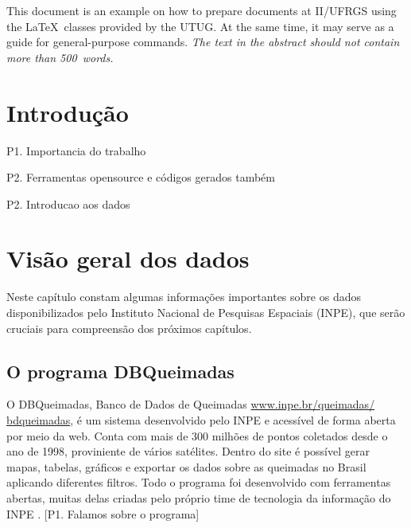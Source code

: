 \documentclass[cic,tc]{iiufrgs}
\begin{document}
\listoffigures

\listoftables

\begin{abstract}
Este documento é um exemplo de como formatar documentos para o
Instituto de Informática da UFRGS usando as classes \LaTeX\
disponibilizadas pelo UTUG\@. Ao mesmo tempo, pode servir de consulta
para comandos mais genéricos. \emph{O texto do resumo não deve
conter mais do que 500 palavras.}
\end{abstract}

\begin{translatedabstract}
This document is an example on how to prepare documents at II/UFRGS
using the \LaTeX\ classes provided by the UTUG\@. At the same time, it
may serve as a guide for general-purpose commands. \emph{The text in
the abstract should not contain more than 500~words.}
\end{translatedabstract}


\chapter{Introdução}
P1. Importancia do trabalho \par
P2. Ferramentas opensource e códigos gerados também \par
P2. Introducao aos dados \par


\chapter{Visão geral dos dados}

Neste capítulo constam algumas informações importantes sobre os 
dados disponibilizados pelo Instituto Nacional de Pesquisas Espaciais (INPE), 
que serão cruciais para compreensão dos próximos capítulos. 

\section{O programa DBQueimadas}

O DBQueimadas, Banco de Dados de Queimadas \url{www.inpe.br/queimadas/
bdqueimadas},
é um sistema desenvolvido pelo INPE e acessível de forma aberta por meio da web. 
Conta com mais de 300 milhões de pontos coletados desde o ano de 1998, 
proviniente de vários satélites. Dentro do site é possível gerar mapas,
tabelas, gráficos e exportar os dados sobre as queimadas no Brasil 
aplicando diferentes filtros. Todo o 
programa foi desenvolvido com ferramentas abertas, muitas delas 
criadas pelo próprio time de tecnologia da informação do INPE 
\citep{setzer2019banco}. [P1. Falamos sobre o programa] \par
\end{document}

